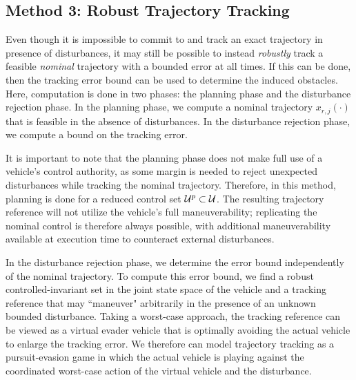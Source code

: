 \subsection{Method 3: Robust Trajectory Tracking \label{sec:rtt}}
Even though it is impossible to commit to and track an exact trajectory in presence of disturbances, it may still be possible to instead \textit{robustly} track a feasible \textit{nominal} trajectory with a bounded error at all times. If this can be done, then the tracking error bound can be used to determine the induced obstacles. Here, computation is done in two phases: the planning phase and the disturbance rejection phase. In the planning phase, we compute a nominal trajectory $x_{r,j}(\cdot)$ that is feasible in the absence of disturbances. In the disturbance rejection phase, we compute a bound on the tracking error.%

It is important to note that the planning phase does not make full use of a vehicle's control authority, as some margin is needed to reject unexpected disturbances while tracking the nominal trajectory. Therefore, in this method, planning is done for a reduced control set $\mathcal{U}^p\subset\mathcal{U}$. The resulting trajectory reference will not utilize the vehicle's full maneuverability; replicating the nominal control is therefore always possible, with additional maneuverability available at execution time to counteract external disturbances.

In the disturbance rejection phase, we determine the error bound independently of the nominal trajectory. To compute this error bound, we find a robust controlled-invariant set in the joint state space of the vehicle and a tracking reference that may ``maneuver" arbitrarily in the presence of an unknown bounded disturbance. Taking a worst-case approach, the tracking reference can be viewed as a virtual evader vehicle that is optimally avoiding the actual vehicle to enlarge the tracking error. We therefore can model trajectory tracking as a pursuit-evasion game in which the actual vehicle is playing against the coordinated worst-case action of the virtual vehicle and the disturbance. %


